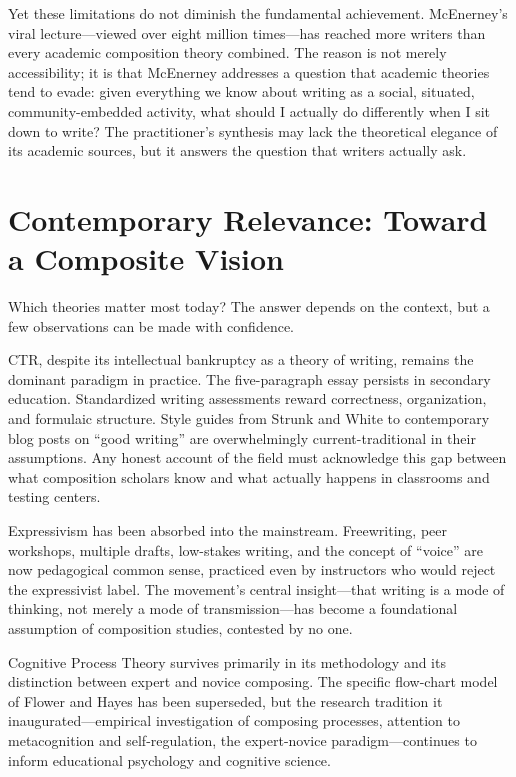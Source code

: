 \documentclass[12pt]{article}
\begin{document}
Yet these limitations do not diminish the fundamental achievement. McEnerney's viral lecture---viewed over eight million times---has reached more writers than every academic composition theory combined. The reason is not merely accessibility; it is that McEnerney addresses a question that academic theories tend to evade: given everything we know about writing as a social, situated, community-embedded activity, what should I actually do differently when I sit down to write? The practitioner's synthesis may lack the theoretical elegance of its academic sources, but it answers the question that writers actually ask.

\section{Contemporary Relevance: Toward a Composite Vision}

Which theories matter most today? The answer depends on the context, but a few observations can be made with confidence.

CTR, despite its intellectual bankruptcy as a theory of writing, remains the dominant paradigm in practice. The five-paragraph essay persists in secondary education. Standardized writing assessments reward correctness, organization, and formulaic structure. Style guides from Strunk and White to contemporary blog posts on ``good writing'' are overwhelmingly current-traditional in their assumptions. Any honest account of the field must acknowledge this gap between what composition scholars know and what actually happens in classrooms and testing centers.

Expressivism has been absorbed into the mainstream. Freewriting, peer workshops, multiple drafts, low-stakes writing, and the concept of ``voice'' are now pedagogical common sense, practiced even by instructors who would reject the expressivist label. The movement's central insight---that writing is a mode of thinking, not merely a mode of transmission---has become a foundational assumption of composition studies, contested by no one.

Cognitive Process Theory survives primarily in its methodology and its distinction between expert and novice composing. The specific flow-chart model of Flower and Hayes has been superseded, but the research tradition it inaugurated---empirical investigation of composing processes, attention to metacognition and self-regulation, the expert-novice paradigm---continues to inform educational psychology and cognitive science.
\end{document}
